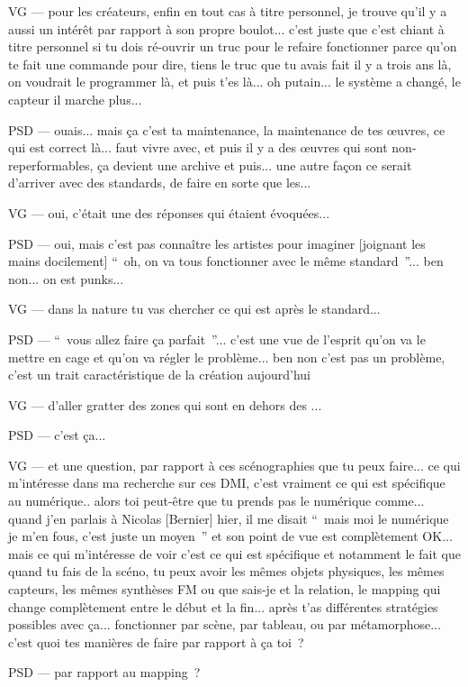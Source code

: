 VG — pour les créateurs, enfin en tout cas à titre personnel,  je trouve qu'il y a aussi un intérêt par rapport à son propre boulot... c'est juste que c'est chiant à titre personnel si tu dois ré-ouvrir un truc pour le refaire fonctionner parce qu'on te fait une commande pour dire, tiens le truc que tu avais fait il y a trois ans là, on voudrait le programmer là, et puis t'es là... oh putain... le système a changé, le capteur il marche plus... 

PSD — ouais... mais ça c'est ta maintenance, la maintenance de tes œuvres, ce qui est correct là... faut vivre avec, et puis il y a des œuvres qui sont non-reperformables, ça devient une archive et puis... une autre façon ce serait d'arriver avec des standards, de faire en sorte que les... 

VG — oui, c'était une des réponses qui étaient évoquées... 

PSD — oui, mais c'est pas connaître les artistes pour imaginer [joignant les mains docilement] “ oh, on va tous fonctionner avec le même standard ”... ben non... on est punks... 

VG — dans la nature tu vas chercher ce qui est après le standard... 

PSD — “ vous allez faire ça parfait ”... c'est une vue de l'esprit qu'on va le mettre en cage et qu'on va régler le problème... ben non c'est pas un problème, c'est un trait caractéristique de la création aujourd'hui 

VG — d'aller gratter des zones qui sont en dehors des ... 

PSD — c'est ça... 

VG — et une question, par rapport à ces scénographies que tu peux faire... ce qui m'intéresse dans ma recherche sur ces DMI, c'est vraiment ce qui est spécifique au numérique.. alors toi peut-être que tu prends pas le numérique comme... quand j'en parlais à Nicolas [Bernier] hier, il me disait “ mais moi le numérique je m'en fous, c'est juste un moyen ” et son point de vue est complètement OK... mais ce qui m'intéresse de voir c'est ce qui est spécifique et notamment le fait que quand tu fais de la scéno, tu peux avoir les mêmes objets physiques, les mêmes capteurs, les mêmes synthèses FM ou que sais-je et la relation, le mapping qui change complètement entre le début et la fin... après t'as différentes stratégies possibles avec ça... fonctionner par scène, par tableau, ou par métamorphose... c'est quoi tes manières de faire par rapport à ça toi ? 

PSD — par rapport au mapping ? 

